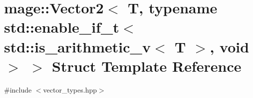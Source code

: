 \hypertarget{structmage_1_1_vector2_3_01_t_00_01typename_01std_1_1enable__if__t_3_01std_1_1is__arithmetic__v_3_01_t_01_4_00_01void_01_4_01_4}{}\section{mage\+:\+:Vector2$<$ T, typename std\+:\+:enable\+\_\+if\+\_\+t$<$ std\+:\+:is\+\_\+arithmetic\+\_\+v$<$ T $>$, void $>$ $>$ Struct Template Reference}
\label{structmage_1_1_vector2_3_01_t_00_01typename_01std_1_1enable__if__t_3_01std_1_1is__arithmetic__v_3_01_t_01_4_00_01void_01_4_01_4}


{\ttfamily \#include $<$vector\+\_\+types.\+hpp$>$}

